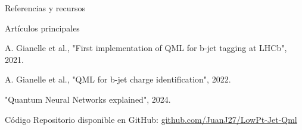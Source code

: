 \documentclass[aspectratio=169]{beamer}
\begin{document}
\begin{frame}{Referencias y recursos}
  \begin{block}{Artículos principales}
    \begin{thebibliography}{3}
        A. Gianelle et al., "First implementation of QML for b-jet tagging at LHCb", 2021.
        \href{https://indico.cern.ch/event/1053287/contributions/4442055/attachments/2332563/3975381/qml@lhcb_zuliani.pdf}{}
      
        A. Gianelle et al., "QML for b-jet charge identification", 2022.
        \href{https://arxiv.org/pdf/2202.13943}{}
      
        "Quantum Neural Networks explained", 2024.
        \href{https://youtu.be/xL383DseSpE}{}
    \end{thebibliography}
  \end{block}
  
  \begin{alertblock}{Código}
    Repositorio disponible en GitHub: \url{github.com/JuanJ27/LowPt-Jet-Qml}
  \end{alertblock}
\end{frame}
\end{document}
